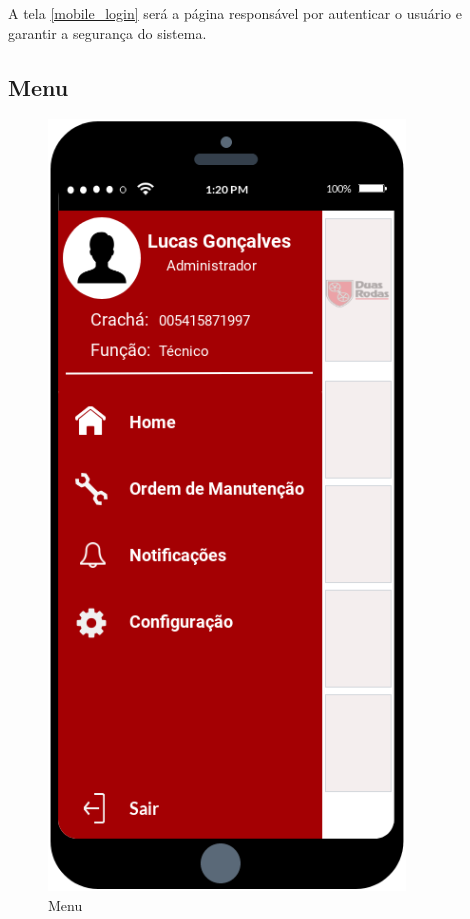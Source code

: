 {	A tela \ref{mobile_login} será a página responsável por autenticar o usuário e garantir a segurança do sistema.
	
	\newpage
	\subsection{Menu}
	
	\begin{figure}[htb]
		\caption{\label{mobile_menu}Menu}
		\begin{center}
			\includegraphics[scale=0.80]{./Figuras/mobile/menu.png}
		\end{center}
	\end{figure}
	
}
